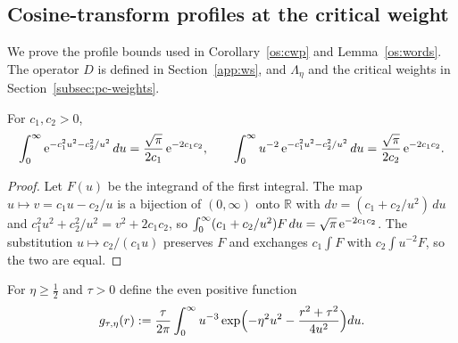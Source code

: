\subsection{Cosine-transform profiles at the critical weight}\label{app:profiles}

We prove the profile bounds used in Corollary~\ref{os:cwp} and Lemma~\ref{os:words}.
The operator $D$ is defined in Section~\ref{app:ws}, and $\Lambda_\eta$ and the critical weights in Section~\ref{subsec:pc-weights}.

\begin{lemma}\label{os:int}
For $c_1,c_2>0$,
\[
\int_0^\infty\mathrm{e}^{-c_1^2u^2-c_2^2/u^2}\,du=\frac{\sqrt\pi}{2c_1}\,\mathrm{e}^{-2c_1c_2},\qquad\int_0^\infty u^{-2}\,\mathrm{e}^{-c_1^2u^2-c_2^2/u^2}\,du=\frac{\sqrt\pi}{2c_2}\,\mathrm{e}^{-2c_1c_2}.
\]
\end{lemma}
\begin{proof}
Let $F(u)$ be the integrand of the first integral. The map $u\mapsto v=c_1u-c_2/u$ is a bijection of $(0,\infty)$ onto $\mathbb R$ with
$dv=(c_1+c_2/u^2)\,du$ and $c_1^2u^2+c_2^2/u^2=v^2+2c_1c_2$, so $\int_0^\infty(c_1+c_2/u^2)F\,du=\sqrt\pi\,\mathrm{e}^{-2c_1c_2}$. The substitution $u\mapsto c_2/(c_1u)$
preserves $F$ and exchanges $c_1\int F$ with $c_2\int u^{-2}F$, so the two are equal.
\end{proof}

For $\eta\ge\tfrac12$ and $\tau>0$ define the even positive function
\[
g_{\tau,\eta}(r):=\frac{\tau}{2\pi}\int_0^\infty u^{-3}\exp\Bigl(-\eta^2u^2-\frac{r^2+\tau^2}{4u^2}\Bigr)du .
\]


